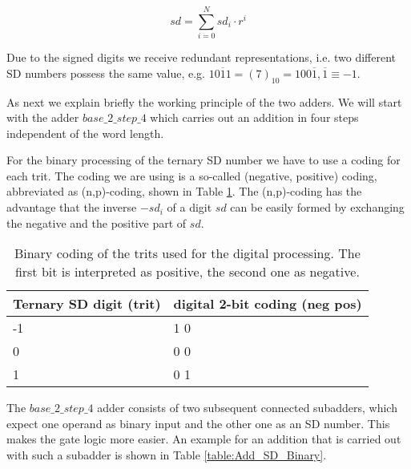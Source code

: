 \documentclass[pageno]{jpaper}
\begin{document}
\begin{equation}
\label{eq:value_sd}
  sd =  \sum_{i=0}^{N} sd_i \cdot r^i  
\end{equation} 

Due to the signed digits we receive redundant representations, i.e. two different SD numbers possess the same value, e.g. $1 0 \overline{1} 1 = (7)_{10} = 1 0 0 \overline{1}, \overline{1} \equiv -1$. 

As next we explain briefly the working principle of the two adders. We will start with the adder $base\_2\_step\_4$ which carries out an addition in four steps independent of the word length. 

For the binary processing of the ternary SD number we have to use a coding for each trit. The coding we are using is a so-called (negative, positive) coding, abbreviated as (n,p)-coding, shown in Table \ref{table:trit_coding}. The (n,p)-coding has the advantage that the inverse $-sd_i$ of a digit $sd$ can be easily formed by exchanging the negative and the positive part of $sd$. 

\begin{table}[h!]
  \centering
  \begin{tabular}{|p{3cm}|p{3cm}|}
    \hline
    \textbf{Ternary SD digit} \newline (trit)  & \textbf{digital 2-bit coding} \newline (neg  pos)\\
    \hline
    \hline
    -1 &   1  0\\
    \hline
    0  &   0  0\\ 
    \hline
    1  &   0  1\\ 
    \hline
  \end{tabular}
  \caption{Binary coding of the trits used for the digital processing. The first bit is interpreted as positive, the second one as negative.}
   \label{table:trit_coding}
\end{table}

The $base\_2\_step\_4$ adder consists of two subsequent connected subadders, which expect one operand as binary input and the other one as an SD number. This makes the gate logic more easier. An example for an addition that is carried out with such a subadder is shown in Table  \ref{table:Add_SD_Binary}. 
\end{document}

